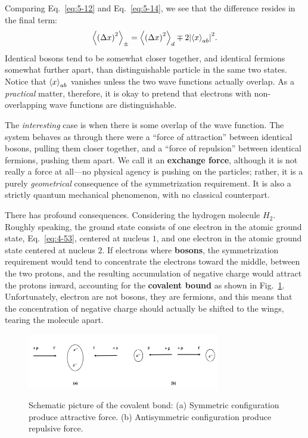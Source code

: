 Comparing Eq.~\eqref{eq:5-12} and Eq.~\eqref{eq:5-14}, we see that the difference resides in the final term:
\begin{equation}
  \label{eq:5-15}
 \expval{ \left( \Delta x \right)^2 }_{\pm} = \expval{ \left( \Delta x \right)^2 }_d \mp 2 \abs{ \expval{x}_{ab} }^{2}.
\end{equation}
Identical bosons tend to be somewhat closer together, and identical fermions somewhat further apart, than distinguishable particle in the same two states.
Notice that $\expval{x}_{ab}$ vanishes unless the two wave functions actually overlap.
As a \textit{practical} matter, therefore, it is okay to pretend that electrons with non-overlapping wave functions are distinguishable.

The \textit{interesting} case is when there is some overlap of the wave function.
The system behaves as through there were a ``force of attraction'' between identical bosons, pulling them closer together, and a ``force of repulsion'' between identical fermions, pushing them apart.
We call it an \textbf{exchange force}, although it is not really a force at all---no physical agency is pushing on the particles; rather, it is a purely \textit{geometrical} consequence of the symmetrization requirement.
It is also a strictly quantum mechanical phenomenon, with no classical counterpart.

There has profound consequences.
Considering the hydrogen molecule $H_{2}$.
Roughly speaking, the ground state consists of one electron in the atomic ground state, Eq.~\eqref{eq:4-53}, centered at nucleus $1$, and one electron in the atomic ground state centered at nucleus $2$.
If electrons where \textbf{bosons}, the symmetrization requirement would tend to concentrate the electrons toward the middle, between the two protons, and the resulting accumulation of negative charge  would attract the protons inward, accounting for the \textbf{covalent bound} as shown in Fig.~\ref{fig:5-1}.
Unfortunately, electron are not bosons, they are fermions, and this means that the concentration of negative charge should actually be shifted to the wings, tearing the molecule apart.
\begin{figure}[t]
  \centering
  \includegraphics[width=0.75\textwidth]{fig/fig5-1.png}
  \label{fig:5-1}
  \caption{Schematic picture of the covalent bond: (a) Symmetric configuration produce attractive force. (b) Antisymmetric configuration produce repulsive force.}
\end{figure}

